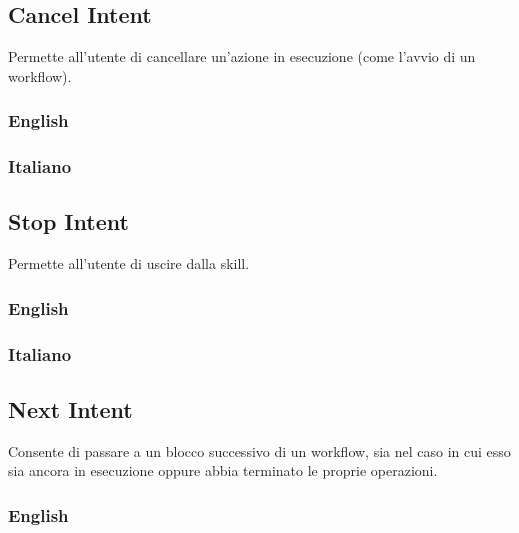 \subsection{Cancel Intent}
Permette all'utente di cancellare un'azione in esecuzione (come l'avvio di un workflow).
\subsubsection{English}
\begin{itemize}
\end{itemize}

\subsubsection{Italiano}
\begin{itemize}
\end{itemize}

\subsection{Stop Intent}
Permette all'utente di uscire dalla skill.
\subsubsection{English}
\begin{itemize}	
\end{itemize}

\subsubsection{Italiano}

\begin{itemize}
\end{itemize}


\subsection{Next Intent}
Consente di passare a un blocco successivo di un workflow, sia nel caso in cui esso sia ancora in esecuzione oppure abbia terminato le proprie operazioni. 
\subsubsection{English}
\begin{itemize}
\end{itemize}

